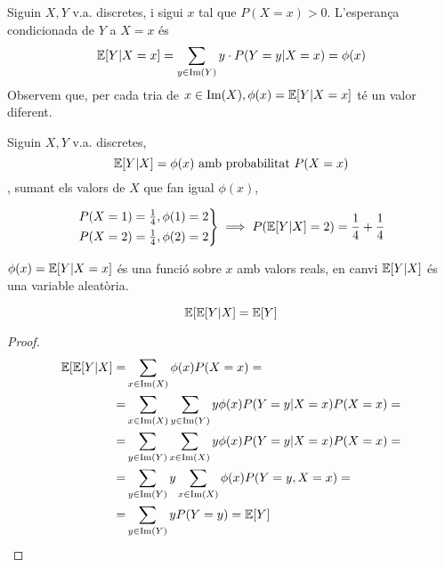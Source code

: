 \begin{defi}
    Siguin $X,Y$ v.a. discretes, i sigui $x$ tal que $P(X=x)>0$. L'esperança condicionada de $Y$ a $X=x$ és
    \[\operatorname{\mathbb{E}}[Y \vert X=x] = \sum_{y \in \operatorname{Im}(Y)} y \cdot P(Y=y \vert X=x) = \phi(x)\]
    Observem que, per cada tria de $x\in\operatorname{Im}(X), \phi(x) = \operatorname{\mathbb{E}}[Y \vert X=x]$ té un valor diferent.
\end{defi}

\begin{defi}
    Siguin $X,Y$ v.a. discretes,
    \[\operatorname{\mathbb{E}}[Y \vert X] = \phi(x) \text{ amb probabilitat } P(X=x)\],
    sumant els valors de $X$ que fan igual $\phi(x)$,
\end{defi}

\begin{example}
    \[\begin{rcases}
    P(X=1) = \frac{1}{4}, \phi(1)=2\\
    P(X=2) = \frac{1}{4}, \phi(2)=2
    \end{rcases} \implies P(\operatorname{\mathbb{E}}[Y \vert X]=2)=\frac{1}{4}+\frac{1}{4}\]
\end{example}

\begin{obs}
    $\phi(x) = \operatorname{\mathbb{E}}[Y \vert X=x]$ és una funció sobre $x$ amb valors reals, en canvi $\operatorname{\mathbb{E}}[Y \vert X]$ és una variable aleatòria.
\end{obs}

\begin{prop}
    \[\operatorname{\mathbb{E}}[\operatorname{\mathbb{E}}[Y \vert X] = \operatorname{\mathbb{E}}[Y]\]
\end{prop}

\begin{proof}
    \begin{align*}
    \operatorname{\mathbb{E}}[\operatorname{\mathbb{E}}[Y \vert X] = & \sum_{x\in\operatorname{Im}(X)} \phi(x)P(X=x) = \\
    = & \sum_{x\in\operatorname{Im}(X)} \sum_{y\in\operatorname{Im}(Y)} y\phi(x)P(Y=y \vert X=x)P(X=x) = \\
    = & \sum_{y\in\operatorname{Im}(Y)} \sum_{x\in\operatorname{Im}(X)} y\phi(x)P(Y=y \vert X=x)P(X=x) = \\
    = & \sum_{y\in\operatorname{Im}(Y)} y\sum_{x\in\operatorname{Im}(X)} \phi(x)P(Y=y,X=x) = \\
    = & \sum_{y\in\operatorname{Im}(Y)} y P(Y=y) = \operatorname{\mathbb{E}}[Y]
    \end{align*}
\end{proof}


